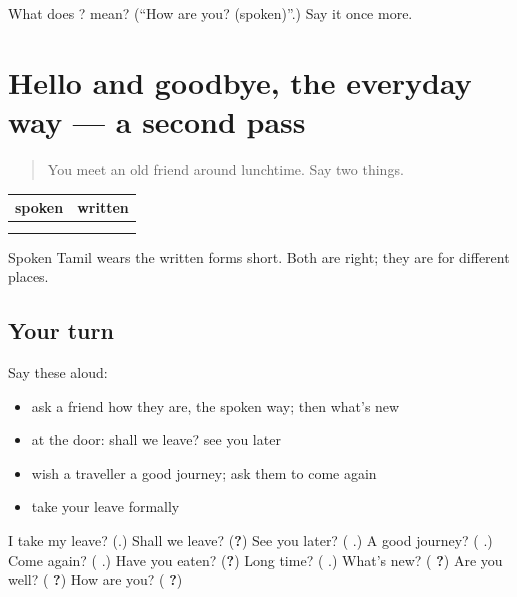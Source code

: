 \begin{tcolorbox}[breakable,colback=teal!4,colframe=teal!35!black,title={Before you move on}]
What does  ? mean? (\textquotedblleft{}How are you? (spoken)\textquotedblright{}.) Say it once more.
\end{tcolorbox}
\section[(dialogue)]{Hello and goodbye, the everyday way — a second pass}

\label{lesson:TA-R108-second-pass-leave-greet}



\begin{quote}
You meet an old friend around lunchtime. Say two things.
\end{quote}

\begin{grammarlens}[title={Grammar Lens: written and spoken}]
\noindent
\begin{tabularx}{\linewidth}{@{}>{\raggedright\arraybackslash}X>{\raggedright\arraybackslash}X@{}}
\toprule
\textbf{spoken} & \textbf{written} \\
\midrule
\textbf{\ta{நல்லா}} & \textbf{\ta{நன்றாக}} \\
\textbf{\ta{இருக்கீங்க}} & \textbf{\ta{இருக்கிறீர்கள்}} \\
\bottomrule
\end{tabularx}

Spoken Tamil wears the written forms short. Both are right; they are for different places.
\end{grammarlens}

\subsection*{Your turn}
Say these aloud:

\begin{itemize}
\raggedright
  \item ask a friend how they are, the spoken way; then what's new
  \item at the door: shall we leave? see you later
  \item wish a traveller a good journey; ask them to come again
  \item take your leave formally
\end{itemize}

\begin{tcolorbox}[breakable,colback=teal!4,colframe=teal!35!black,title={Before you move on}]
I take my leave? (\textbf{}.) Shall we leave? (\textbf{?}) See you later? (\textbf{ }.) A good journey? (\textbf{ }.) Come again? (\textbf{ }.) Have you eaten? (\textbf{?}) Long time? (\textbf{ }.) What's new? (\textbf{ ?}) Are you well? (\textbf{ ?}) How are you? (\textbf{ ?})
\end{tcolorbox}
